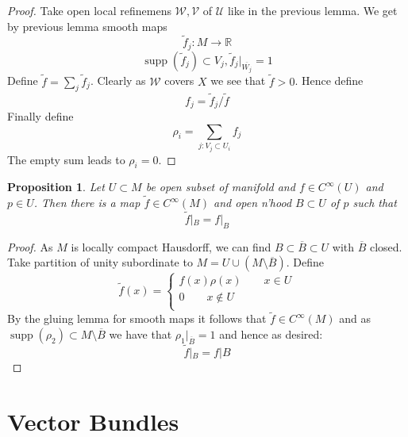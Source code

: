 \documentclass{article}
\numberwithin{theorem}{section}
\newtheorem{proposition}[theorem]{Proposition}
\newcommand{\R}{\mathbb{R}}
\newcommand{\1}{\mathds{1}}
\DeclareMathOperator{\supp}{supp}
\begin{document}
\begin{proof}
    Take open local refinemens $\mathcal{W}, \mathcal{V}$ of $\mathcal{U}$ like in the previous lemma. We get by previous lemma smooth maps 
    \[ \tilde{f}_j : M \to \R \]
    \[ \supp(\tilde{f}_j) \subset V_j, \tilde{f}_j|_{\overline{W_j}} = 1 \]
    Define $\tilde{f} = \sum_{j} \tilde{f}_j $. Clearly as $\mathcal{W}$ covers $X$ we see that $\tilde{f} >0$. Hence define 
    \[ f_j = \tilde{f}_j  / \tilde{f}  \]
    Finally define 
    \[ \rho_i = \sum_{j: V_j \subset U_i} f_j \]
    The empty sum leads to $\rho_i = 0$. 
\end{proof}

\begin{proposition}\label{map_extension}
    Let $U \subset M$ be open subset of manifold and $f \in C^\infty(U)$ and $p \in U$. Then there is a map $\tilde{f} \in C^\infty(M)$ and open n'hood $B \subset U$ of $p$ such that 
    \[ \tilde{f}|_B = f|_B  \]
\end{proposition}

\begin{proof}
    As $M$ is locally compact Hausdorff, we can find $B \subset \overline{B} \subset U$ with $\overline{B}$ closed. Take partition of unity subordinate to $M = U \cup (M \setminus \overline{B})$. Define 
    \[ \tilde{f}(x) = \begin{cases}
        f(x) \rho(x) \qquad x \in U \\
        0 \qquad x \notin U  \\ 
    \end{cases}\]
    By the gluing lemma for smooth maps it follows that $\tilde{f} \in C^\infty(M)$ and as $\supp(\rho_2) \subset M \setminus \overline{B}$ we have that $\rho_1|_{\overline{B}} = 1$ and hence as desired: 
    \[ \tilde{f}|_B = f|B \]
\end{proof}

\section{Vector Bundles}
\end{document}
